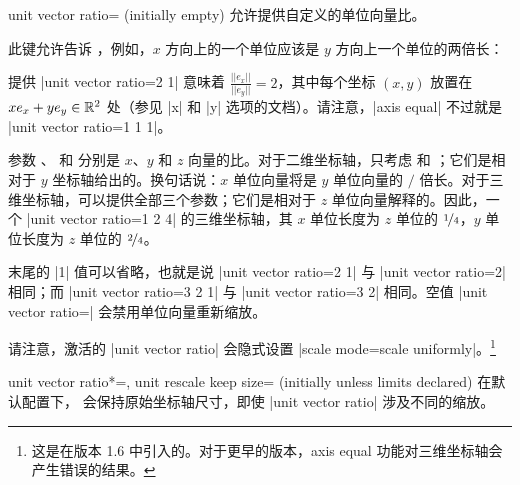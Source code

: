 \begin{pgfplotskey}{unit vector ratio= (initially empty)}
    允许提供自定义的单位向量比。

    此键允许告诉 \PGFPlots{}，例如，$x$ 方向上的一个单位应该是 $y$ 方向上一个单位的两倍长：
\begin{codeexample}[]
\end{codeexample}
    \noindent 提供 |unit vector ratio=2 1| 意味着 $\frac{||e_x||}{||e_y||} = 2$，其中每个坐标 $(x,y)$ 放置在 $x e_x + y e_y \in \mathbb{R}^2$ 处（参见 |x| 和 |y| 选项的文档）。请注意，|axis equal| 不过就是 |unit vector ratio=1 1 1|。

    参数 、 和  分别是 $x$、$y$ 和 $z$ 向量的比。对于二维坐标轴，只考虑  和 ；它们是相对于 $y$ 坐标轴给出的。换句话说：$x$ 单位向量将是 $y$ 单位向量的 $/$ 倍长。对于三维坐标轴，可以提供全部三个参数；它们是相对于 $z$ 单位向量解释的。因此，一个 |unit vector ratio=1 2 4| 的三维坐标轴，其 $x$ 单位长度为 $z$ 单位的 $\nicefrac 14$，$y$ 单位长度为 $z$ 单位的 $\nicefrac24$。

    末尾的 |1| 值可以省略，也就是说 |unit vector ratio=2 1| 与 |unit vector ratio=2| 相同；而 |unit vector ratio=3 2 1| 与 |unit vector ratio=3 2| 相同。空值 |unit vector ratio={}| 会禁用单位向量重新缩放。

    请注意，激活的 |unit vector ratio| 会隐式设置 |scale mode=scale uniformly|。\footnote{这是在版本 1.6 中引入的。对于更早的版本，axis equal 功能对三维坐标轴会产生错误的结果。}

    \begin{pgfplotskeylist}{%
        unit vector ratio*=,
        unit rescale keep size= (initially unless limits declared)%
    }
    \label{key:unit:rescale:keep:size}
        在默认配置下，\PGFPlots{} 会保持原始坐标轴尺寸，即使 |unit vector ratio| 涉及不同的缩放。


\end{pgfplotskeylist}
\end{pgfplotskey}
